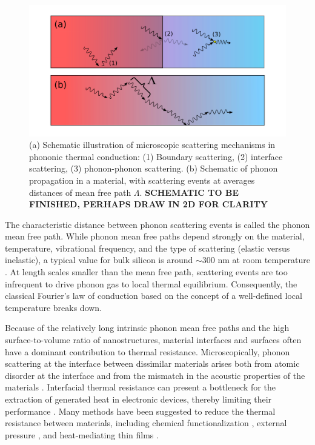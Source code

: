 \begin{figure}
\begin{center}
 \includegraphics[width=.99\columnwidth]{inkscape/scattering.pdf}
 \caption{(a) Schematic illustration of microscopic scattering mechanisms in phononic thermal conduction: (1) Boundary scattering, (2) interface scattering, (3) phonon-phonon scattering. (b) Schematic of phonon propagation in a material, with scattering events at averages distances of mean free path $\Lambda$. \textbf{SCHEMATIC TO BE FINISHED, PERHAPS DRAW IN 2D FOR CLARITY}}
\label{fig:intro_scattering}
\end{center}
\end{figure}

The characteristic distance between phonon scattering events is called the phonon mean free path. While phonon mean free paths depend strongly on the material, temperature, vibrational frequency, and the type of scattering (elastic versus inelastic), a typical value for bulk silicon is around $\sim 300$ nm at room temperature \cite{ju99}. At length scales smaller than the mean free path, scattering events are too infrequent to drive phonon gas to local thermal equilibrium. Consequently, the classical Fourier's law of conduction \cite{fourier} based on the concept of a well-defined local temperature breaks down. 

Because of the relatively long intrinsic phonon mean free paths and the high surface-to-volume ratio of nanostructures, material interfaces and surfaces often have a dominant contribution to thermal resistance. Microscopically, phonon scattering at the interface between dissimilar materials arises both from atomic disorder at the interface and from the mismatch in the acoustic properties of the materials \cite{khalatnikov52}. Interfacial thermal resistance can present a bottleneck for the extraction of generated heat in electronic devices, thereby limiting their performance \cite{pop10}. Many methods have been suggested to reduce the thermal resistance between materials, including chemical functionalization \cite{hopkins11,kaur14,han15b}, external pressure \cite{shen11,chalopin12}, and heat-mediating thin films \cite{english12}. 

